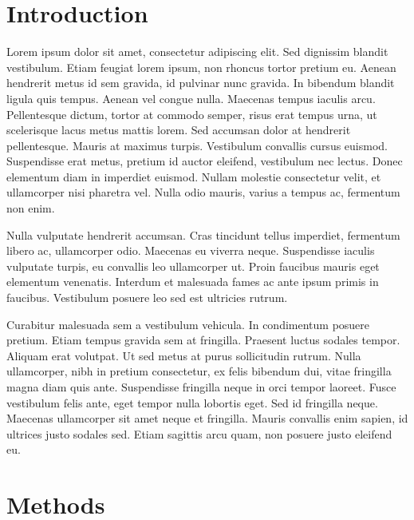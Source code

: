 \maketitle

\section{Introduction}
%
Lorem ipsum dolor sit amet, consectetur adipiscing elit. Sed dignissim blandit vestibulum. Etiam feugiat lorem ipsum, non rhoncus tortor pretium eu. Aenean hendrerit metus id sem gravida, id pulvinar nunc gravida. In bibendum blandit ligula quis tempus. Aenean vel congue nulla. Maecenas tempus iaculis arcu. Pellentesque dictum, tortor at commodo semper, risus erat tempus urna, ut scelerisque lacus metus mattis lorem. Sed accumsan dolor at hendrerit pellentesque. Mauris at maximus turpis. Vestibulum convallis cursus euismod. Suspendisse erat metus, pretium id auctor eleifend, vestibulum nec lectus. Donec elementum diam in imperdiet euismod. Nullam molestie consectetur velit, et ullamcorper nisi pharetra vel. Nulla odio mauris, varius a tempus ac, fermentum non enim.

Nulla vulputate hendrerit accumsan. Cras tincidunt tellus imperdiet, fermentum libero ac, ullamcorper odio. Maecenas eu viverra neque. Suspendisse iaculis vulputate turpis, eu convallis leo ullamcorper ut. Proin faucibus mauris eget elementum venenatis. Interdum et malesuada fames ac ante ipsum primis in faucibus. Vestibulum posuere leo sed est ultricies rutrum.

Curabitur malesuada sem a vestibulum vehicula. In condimentum posuere pretium. Etiam tempus gravida sem at fringilla. Praesent luctus sodales tempor. Aliquam erat volutpat. Ut sed metus at purus sollicitudin rutrum. Nulla ullamcorper, nibh in pretium consectetur, ex felis bibendum dui, vitae fringilla magna diam quis ante. Suspendisse fringilla neque in orci tempor laoreet. Fusce vestibulum felis ante, eget tempor nulla lobortis eget. Sed id fringilla neque. Maecenas ullamcorper sit amet neque et fringilla. Mauris convallis enim sapien, id ultrices justo sodales sed. Etiam sagittis arcu quam, non posuere justo eleifend eu.

\section{Methods}\label{sec:methods}

